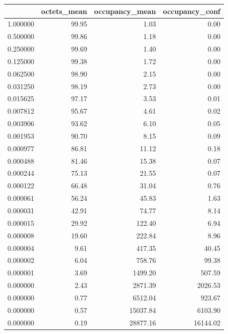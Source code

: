 \begin{tabular}{lrrr}
\toprule
 & octets_mean & occupancy_mean & occupancy_conf \\
\midrule
1.000000 & 99.95 & 1.03 & 0.00 \\
0.500000 & 99.86 & 1.18 & 0.00 \\
0.250000 & 99.69 & 1.40 & 0.00 \\
0.125000 & 99.38 & 1.72 & 0.00 \\
0.062500 & 98.90 & 2.15 & 0.00 \\
0.031250 & 98.19 & 2.73 & 0.00 \\
0.015625 & 97.17 & 3.53 & 0.01 \\
0.007812 & 95.67 & 4.61 & 0.02 \\
0.003906 & 93.62 & 6.10 & 0.05 \\
0.001953 & 90.70 & 8.15 & 0.09 \\
0.000977 & 86.81 & 11.12 & 0.18 \\
0.000488 & 81.46 & 15.38 & 0.07 \\
0.000244 & 75.13 & 21.55 & 0.07 \\
0.000122 & 66.48 & 31.04 & 0.76 \\
0.000061 & 56.24 & 45.83 & 1.63 \\
0.000031 & 42.91 & 74.77 & 8.14 \\
0.000015 & 29.92 & 122.40 & 6.94 \\
0.000008 & 19.60 & 222.84 & 8.96 \\
0.000004 & 9.61 & 417.35 & 40.45 \\
0.000002 & 6.04 & 758.76 & 99.38 \\
0.000001 & 3.69 & 1499.20 & 507.59 \\
0.000000 & 2.43 & 2871.39 & 2026.53 \\
0.000000 & 0.77 & 6512.04 & 923.67 \\
0.000000 & 0.57 & 15037.84 & 6103.90 \\
0.000000 & 0.19 & 28877.16 & 16144.02 \\
\bottomrule
\end{tabular}
